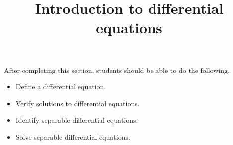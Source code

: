 \documentclass{ximera}
\title{Introduction to differential equations}
\begin{document}
\begin{abstract}
\end{abstract}

\maketitle

\begin{sectionOutcomes}

After completing this section, students should be able to do the following.

\begin{itemize}
	\item Define a differential equation.
	\item Verify solutions to differential equations.
\item Identify separable differential equations.
\item Solve separable differential equations.
\end{itemize}

\end{sectionOutcomes}
\end{document}
